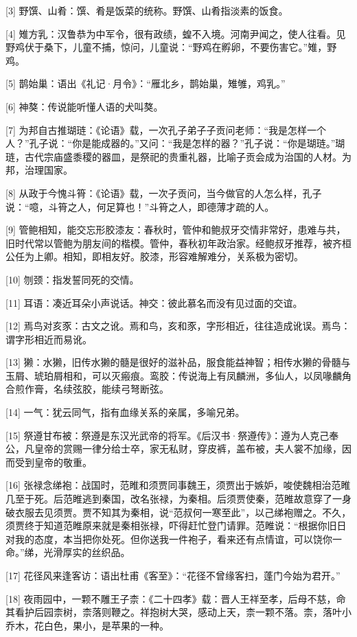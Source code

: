 \documentclass[12pt,UTF8]{ctexbook}
\begin{document}
[3] 野馔、山肴：馔、肴是饭菜的统称。野馔、山肴指淡素的饭食。

[4] 雉方乳：汉鲁恭为中军令，很有政绩，蝗不入境。河南尹闻之，使人往看。见野鸡伏于桑下，儿童不捕，惊问，儿童说：“野鸡在孵卵，不要伤害它。”雉，野鸡。

[5] 鹊始巢：语出《礼记·月令》：“雁北乡，鹊始巢，雉雊，鸡乳。”

[6] 神獒：传说能听懂人语的犬叫獒。

[7] 为邦自古推瑚琏：《论语》载，一次孔子弟子子贡问老师：“我是怎样一个人？”孔子说：“你是能成器的。”又问：“我是怎样的器？”孔子说：“你是瑚琏。”瑚琏，古代宗庙盛黍稷的器皿，是祭祀的贵重礼器，比喻子贡会成为治国的人材。为邦，治理国家。

[8] 从政于今愧斗筲：《论语》载，一次子贡问，当今做官的人怎么样，孔子说：“噫，斗筲之人，何足算也！”斗筲之人，即德薄才疏的人。

[9] 管鲍相知，能交忘形胶漆友：春秋时，管仲和鲍叔牙交情非常好，患难与共，旧时代常以管鲍为朋友间的楷模。管仲，春秋初年政治家。经鲍叔牙推荐，被齐桓公任为上卿。相知，即相友好。胶漆，形容难解难分，关系极为密切。

[10] 刎颈：指发誓同死的交情。

[11] 耳语：凑近耳朵小声说话。神交：彼此慕名而没有见过面的交谊。

[12] 焉鸟对亥豕：古文之讹。焉和鸟，亥和豕，字形相近，往往造成讹误。焉鸟：谓字形相近而易讹。

[13] 獭：水獭，旧传水獭的髓是很好的滋补品，服食能益神智；相传水獭的骨髓与玉屑、琥珀屑相和，可以灭瘢痕。鸾胶：传说海上有凤麟洲，多仙人，以凤喙麟角合煎作膏，名续弦胶，能续弓弩断弦。

[14] 一气：犹云同气，指有血缘关系的亲属，多喻兄弟。

[15] 祭遵甘布被：祭遵是东汉光武帝的将军。《后汉书·祭遵传》：遵为人克己奉公，凡皇帝的赏赐一律分给士卒，家无私财，穿皮裤，盖布被，夫人裳不加缘，因而受到皇帝的敬重。

[16] 张禄念绨袍：战国时，范睢和须贾同事魏王，须贾出于嫉妒，唆使魏相治范睢几至于死。后范睢逃到秦国，改名张禄，为秦相。后须贾使秦，范睢故意穿了一身破衣服去见须贾。贾不知其为秦相，说“范叔何一寒至此”，以己绨袍赠之。不久，须贾终于知道范睢原来就是秦相张禄，吓得赶忙登门请罪。范睢说：“根据你旧日对我的态度，本当把你处死。但你送我一件袍子，看来还有点情谊，可以饶你一命。”绨，光滑厚实的丝织品。

[17] 花径风来逢客访：语出杜甫《客至》：“花径不曾缘客扫，蓬门今始为君开。”

[18] 夜雨园中，一颗不雕王子柰：《二十四孝》载：晋人王祥至孝，后母不慈，命其看护后园柰树，柰落则鞭之。祥抱树大哭，感动上天，柰一颗不落。柰，落叶小乔木，花白色，果小，是苹果的一种。
\end{document}
